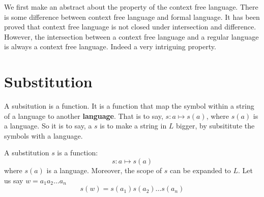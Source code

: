 \documentclass[../main]{subfiles}
\begin{document}
We 
first make an abstract about the property of the 
context free language. There is some difference between 
context free language and formal language. It has been 
proved that context free language is not closed under intersection 
and difference. However, the intersection between a context free 
language and a regular language is always a context free 
language. Indeed a very intriguing property. 

\section{Substitution}
\label{sec:Substitution}
A 
subsitution is a function. It is a function that map the symbol 
within a string of a language to another \textbf{language}.
That is to say, \(s \colon a \mapsto  s (a) \), where \(s (a) \) is a language. 
So it is to say, a \(s\) is to make a string in \(L\) bigger, by subsititute the 
symbols with a language.
\begin{definition}[substitutions]\label{def:substitutions}
A substitution \(s\) is a function: 
\[
	s \colon a \mapsto s (a) 
\]
	where \(s(a)\) is a language.
Moreover, the scope of \(s\) can be expanded to \(L\). Let us say \(w = a_1 a_2 \dots a_{n}\)
\[	
	s (w ) =  s (a_1) s(a_2) \dots s (a_n)
\] 
\end{definition}
\end{document}
